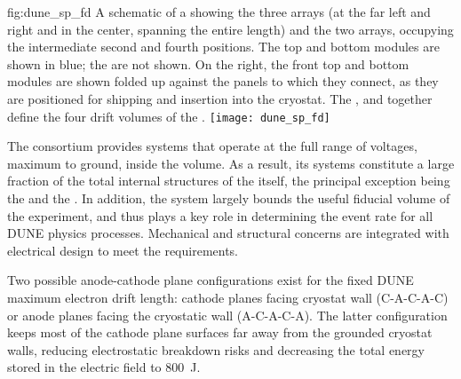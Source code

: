 \begin{dunefigure}%
{fig:dune_sp_fd}
{%
A schematic of a  showing the three  arrays (at the far left and right and in the center, spanning the entire  length) and the two  arrays, occupying the intermediate second and fourth positions. The top and bottom  modules are shown in blue; the  are not shown. 
On the right, the front top and bottom  modules are shown folded up against the  panels to which they connect, as they are positioned for shipping and insertion into the cryostat.  The ,  and  together define the four drift volumes of the .}
\texttt{[image: dune\_sp\_fd]}
\end{dunefigure}

The  consortium provides systems that operate at the full range of voltages, %
maximum to ground, inside the  volume. As a result, its systems constitute a large fraction of the total internal structures of the  itself, the principal exception being the  and the . In addition, the  system largely bounds the useful fiducial volume of the experiment, and thus plays a key role in determining the event rate for all DUNE physics processes. Mechanical and structural concerns are integrated with electrical design to meet the requirements. 


Two possible anode-cathode plane configurations exist for the fixed DUNE maximum electron drift length: cathode planes facing cryostat wall (C-A-C-A-C) or anode planes facing the cryostatic wall (A-C-A-C-A).  The latter configuration keeps most of the cathode plane surfaces far away from the grounded cryostat walls, reducing electrostatic breakdown risks and decreasing the total energy stored in the electric field to \SI{800}{J}.

